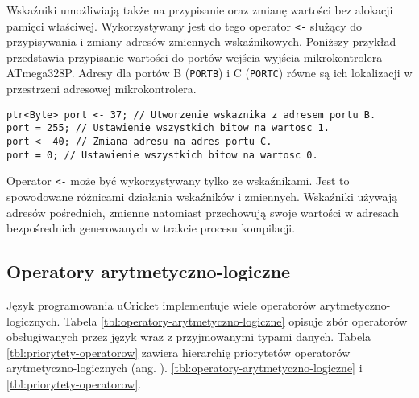 Wskaźniki umożliwiają także na przypisanie oraz zmianę wartości bez alokacji pamięci właściwej. Wykorzystywany jest do tego operator \lstinline|<-| służący do przypisywania i zmiany adresów zmiennych wskaźnikowych. Poniższy przykład przedstawia przypisanie wartości do portów wejścia-wyjścia mikrokontrolera ATmega328P. Adresy dla portów B (\lstinline|PORTB|) i C (\lstinline|PORTC|) równe są ich lokalizacji w przestrzeni adresowej mikrokontrolera\cite{ATmega328P8bitAVR}.
\begin{lstlisting}
ptr<Byte> port <- 37; // Utworzenie wskaznika z adresem portu B.
port = 255; // Ustawienie wszystkich bitow na wartosc 1.
port <- 40; // Zmiana adresu na adres portu C.
port = 0; // Ustawienie wszystkich bitow na wartosc 0.
\end{lstlisting}
Operator \lstinline|<-| może być wykorzystywany tylko ze wskaźnikami. Jest to spowodowane różnicami działania wskaźników i zmiennych. Wskaźniki używają adresów pośrednich, zmienne natomiast przechowują swoje wartości w adresach bezpośrednich generowanych w trakcie procesu kompilacji.

\subsection{Operatory arytmetyczno-logiczne}
Język programowania uCricket implementuje wiele operatorów aryt\-me\-ty\-cz\-no-lo\-gi\-cz\-nych. Tabela \ref{tbl:operatory-arytmetyczno-logiczne} opisuje zbór operatorów obsługiwanych przez język wraz z przyjmowanymi typami danych. Tabela \ref{tbl:priorytety-operatorow} zawiera hierarchię priorytetów operatorów arytmetyczno-logicznych (ang. ). \ref{tbl:operatory-arytmetyczno-logiczne} i \ref{tbl:priorytety-operatorow}.

